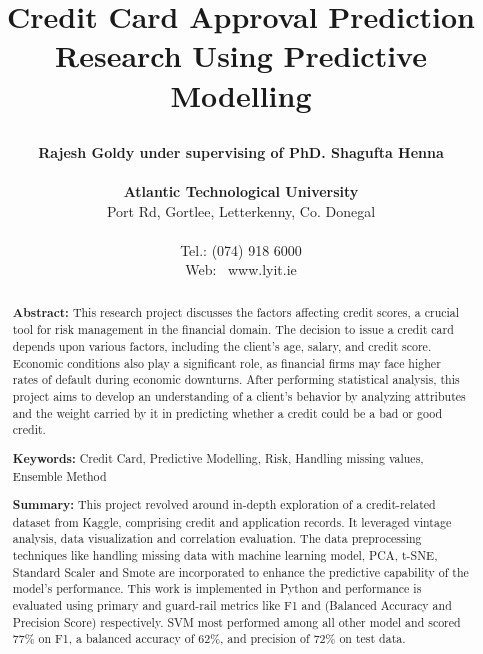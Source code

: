 \documentclass[10pt]{article}
\title{\vspace{0cm} \fontsize{10}{12}\selectfont \textbf{Credit Card Approval Prediction Research Using Predictive Modelling} 

\vspace{4mm} }
\author{\fontsize{10}{12}\selectfont \textbf{\fontsize{10}{12}\selectfont Rajesh Goldy under supervising of PhD. Shagufta Henna} \\ \\
\small{\textbf{\fontsize{10}{12}\selectfont Atlantic Technological University}}\\
\small{\fontsize{10}{12}\selectfont Port Rd, Gortlee, Letterkenny, Co. Donegal}\\
 \\ \small{\fontsize{10}{12}\selectfont Tel.: (074) 918 6000}\\
\small{\fontsize{10}{12}\selectfont Web: \ www.lyit.ie}}
\date{\vspace{-6mm}}
\begin{document}
\fontsize{10}{12}\selectfont


\def\tablename{Tabla}%

\setlength{\parskip}{0mm}

\maketitle

\setlength{\parskip}{3mm}


\renewcommand\abstractname{}

\begin{abstract}
    \fontsize{10}{12}\selectfont
    \textbf{Abstract:} This research project discusses the factors affecting credit scores, a crucial tool for risk management in the financial domain. The decision to issue a credit card depends upon various factors, including the client's age, salary, and credit score. Economic conditions also play a significant role, as financial firms may face higher rates of default during economic downturns. After performing statistical analysis, this project aims to develop an understanding of a client’s behavior by analyzing attributes and the weight carried by it in predicting whether a credit could be a bad or good credit. 

    \vspace{3mm}
    
    \textbf{Keywords:} Credit Card, Predictive Modelling, Risk, Handling missing values, Ensemble Method
    \vspace{-7mm}
\end{abstract}


\renewcommand\abstractname{}

\begin{abstract}
    \fontsize{10}{12}\selectfont
    \textbf{Summary:} 
    This project revolved around in-depth exploration of a credit-related dataset from Kaggle, comprising credit and application records. It leveraged vintage analysis, data visualization and correlation evaluation. The data preprocessing techniques like handling missing data with machine learning model, PCA, t-SNE, Standard Scaler and Smote are incorporated to enhance the predictive capability of the model’s performance. This work is implemented in Python and performance is evaluated using primary and guard-rail metrics like F1 and (Balanced Accuracy and Precision Score) respectively. SVM most performed among all other model and scored 77\% on F1, a balanced accuracy of 62\%, and precision of 72\% on test data.
    
    \vspace{3mm}
    
\end{abstract}
\end{document}

